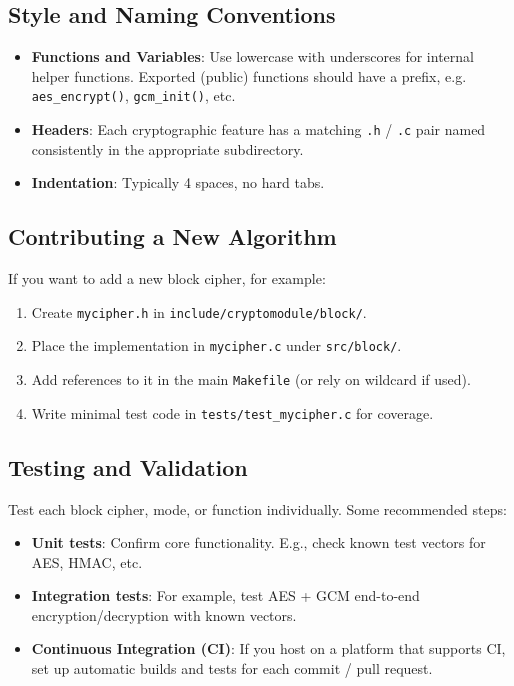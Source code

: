 \documentclass[12pt,a4paper]{article}
\begin{document}
\subsection{Style and Naming Conventions}
\begin{itemize}
    \item \textbf{Functions and Variables}: Use lowercase with underscores for internal helper functions. Exported (public) functions should have a prefix, e.g. \texttt{aes\_encrypt()}, \texttt{gcm\_init()}, etc.
    \item \textbf{Headers}: Each cryptographic feature has a matching \texttt{.h} / \texttt{.c} pair named consistently in the appropriate subdirectory.
    \item \textbf{Indentation}: Typically 4 spaces, no hard tabs.
\end{itemize}

\subsection{Contributing a New Algorithm}
If you want to add a new block cipher, for example:
\begin{enumerate}
    \item Create \texttt{mycipher.h} in \texttt{include/cryptomodule/block/}.
    \item Place the implementation in \texttt{mycipher.c} under \texttt{src/block/}.
    \item Add references to it in the main \texttt{Makefile} (or rely on wildcard if used).
    \item Write minimal test code in \texttt{tests/test\_mycipher.c} for coverage.
\end{enumerate}

\subsection{Testing and Validation}
Test each block cipher, mode, or function individually. Some recommended steps:
\begin{itemize}
    \item \textbf{Unit tests}: Confirm core functionality. E.g., check known test vectors for AES, HMAC, etc.
    \item \textbf{Integration tests}: For example, test AES + GCM end-to-end encryption/decryption with known vectors.
    \item \textbf{Continuous Integration (CI)}: If you host on a platform that supports CI, set up automatic builds and tests for each commit / pull request.
\end{itemize}
\end{document}
